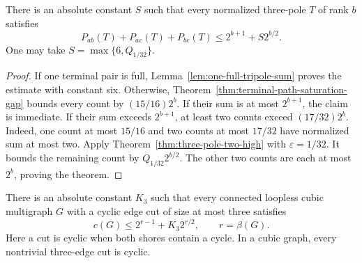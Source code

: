 \begin{theorem}
\label{thm:universal-tripole-sum}
There is an absolute constant $S$ such that every normalized three-pole $T$ of rank $b$ satisfies
\[
 P_{ab}(T)+P_{ac}(T)+P_{bc}(T)
 \le2^{b+1}+S2^{b/2}.
\]
One may take $S=\max\{6,Q_{1/32}\}$.
\end{theorem}

\begin{proof}
If one terminal pair is full, Lemma~\ref{lem:one-full-tripole-sum} proves the estimate with constant six.
Otherwise, Theorem~\ref{thm:terminal-path-saturation-gap} bounds every count by $(15/16)2^b$.
If their sum is at most $2^{b+1}$, the claim is immediate.
If their sum exceeds $2^{b+1}$, at least two counts exceed $(17/32)2^b$.
Indeed, one count at most $15/16$ and two counts at most $17/32$ have normalized sum at most two.
Apply Theorem~\ref{thm:three-pole-two-high} with $\varepsilon=1/32$.
It bounds the remaining count by $Q_{1/32}2^{b/2}$.
The other two counts are each at most $2^b$, proving the theorem.
\end{proof}

\begin{theorem}
\label{thm:all-three-cut-half-exponent}
There is an absolute constant $K_3$ such that every connected loopless cubic multigraph $G$ with a cyclic edge cut of size at most three satisfies
\[
 c(G)\le2^{r-1}+K_3 2^{r/2},\qquad r=\beta(G).
\]
Here a cut is cyclic when both shores contain a cycle.
In a cubic graph, every nontrivial three-edge cut is cyclic.
\end{theorem}

